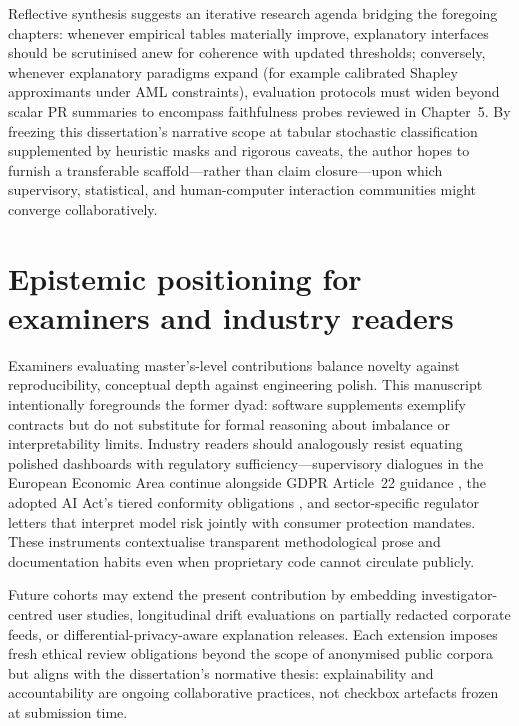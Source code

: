Reflective synthesis suggests an iterative research agenda bridging the foregoing chapters: whenever empirical tables materially improve, explanatory interfaces should be scrutinised anew for coherence with updated thresholds; conversely, whenever explanatory paradigms expand (for example calibrated Shapley approximants under AML constraints), evaluation protocols must widen beyond scalar PR summaries to encompass faithfulness probes reviewed in Chapter~5. By freezing this dissertation’s narrative scope at tabular stochastic classification supplemented by heuristic masks and rigorous caveats, the author hopes to furnish a transferable scaffold—rather than claim closure—upon which supervisory, statistical, and human-computer interaction communities might converge collaboratively.

\section{Epistemic positioning for examiners and industry readers}
Examiners evaluating master’s-level contributions balance novelty against reproducibility, conceptual depth against engineering polish. This manuscript intentionally foregrounds the former dyad: software supplements exemplify contracts but do not substitute for formal reasoning about imbalance or interpretability limits. Industry readers should analogously resist equating polished dashboards with regulatory sufficiency—supervisory dialogues in the European Economic Area continue alongside GDPR Article~22 guidance \cite{gdpr_text}, the adopted AI Act's tiered conformity obligations \cite{eu_ai_act2024}, and sector-specific regulator letters that interpret model risk jointly with consumer protection mandates. These instruments contextualise transparent methodological prose and documentation habits even when proprietary code cannot circulate publicly.

Future cohorts may extend the present contribution by embedding investigator-centred user studies, longitudinal drift evaluations on partially redacted corporate feeds, or differential-privacy-aware explanation releases. Each extension imposes fresh ethical review obligations beyond the scope of anonymised public corpora but aligns with the dissertation’s normative thesis: explainability and accountability are ongoing collaborative practices, not checkbox artefacts frozen at submission time.